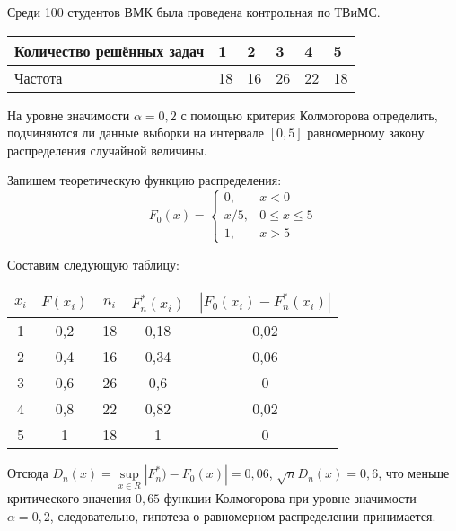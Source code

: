 \begin{exmp}
Среди 100 студентов ВМК была проведена контрольная по ТВиМС.
\begin{center}
    \begin{tabular}{|l|l|l|l|l|l|}
    \hline Количество решённых задач & 1  & 2  & 3  & 4  & 5 \\
    \hline Частота                   & 18 & 16 & 26 & 22 & 18 \\
    \hline
\end{tabular}
\end{center}
На уровне значимости $\alpha=0{,}2$ с помощью критерия Колмогорова определить, 
подчиняются ли данные выборки на интервале $[0, 5]$ равномерному закону распределения случайной величины.

Запишем теоретическую функцию распределения:
\begin{equation*}
    F_{0}(x) = \begin{cases}
        0, & x<0 \\
        x/5, & 0 \leqslant x \leqslant 5 \\
        1, & x>5    
    \end{cases}
\end{equation*}

Составим следующую таблицу:
\begin{center}
    \begin{tabular}{|c|c|c|c|c|}
        \hline $x_{i}$ & $F(x_{i})$ & $n_{i}$ & $F^{*}_{n}(x_{i})$ & $|F_{0}(x_{i})-F^{*}_{n}(x_{i})|$ \\
        \hline 1 & 0{,}2 & 18 & 0{,}18 & 0{,}02 \\
        \hline 2 & 0{,}4 & 16 & 0{,}34 & 0{,}06 \\
        \hline 3 & 0{,}6 & 26 & 0{,}6  & 0    \\
        \hline 4 & 0{,}8 & 22 & 0{,}82 & 0{,}02 \\
        \hline 5 &   1 & 18 &    1 & 0    \\
        \hline
    \end{tabular}
\end{center}
Отсюда $D_{n}(x)=\sup\limits_{x \in R}\left|F_{n}^{*})-F_{0}(x)\right| = 0{,}06$, $\sqrt{n}D_{n}(x) = 0{,}6$, 
что меньше критического значения $0{,}65$ функции Колмогорова при уровне значимости $\alpha=0{,}2$, следовательно, гипотеза о равномерном распределении принимается.
\end{exmp}
